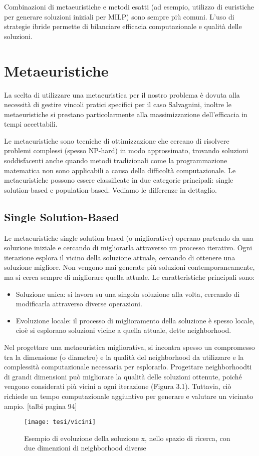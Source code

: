 Combinazioni di metaeuristiche e metodi esatti (ad esempio, utilizzo di euristiche per generare soluzioni iniziali per MILP) sono sempre più comuni. L'uso di strategie ibride permette di bilanciare efficacia computazionale e qualità delle soluzioni. 

\section{Metaeuristiche}

La scelta di utilizzare una metaeuristica per il nostro problema è dovuta alla necessità di gestire vincoli pratici specifici per il caso Salvagnini, inoltre le metaeuristiche si prestano particolarmente alla massimizzazione dell'efficacia in tempi accettabili.

Le metaeuristiche sono tecniche di ottimizzazione che cercano di risolvere problemi complessi (spesso NP-hard) in modo approssimato, trovando soluzioni soddisfacenti anche quando metodi tradizionali come la programmazione matematica non sono applicabili a causa della difficoltà computazionale. Le metaeuristiche possono essere classificate in due categorie principali: single solution-based e population-based. Vediamo le differenze in dettaglio.

\subsection{Single Solution-Based}

Le metaeuristiche single solution-based (o migliorative) operano partendo da una soluzione iniziale e cercando di migliorarla attraverso un processo iterativo. Ogni iterazione esplora il vicino della soluzione attuale, cercando di ottenere una soluzione migliore. Non vengono mai generate più soluzioni contemporaneamente, ma si cerca sempre di migliorare quella attuale. Le caratteristiche principali sono:
\begin{itemize}
    \item Soluzione unica: si lavora su una singola soluzione alla volta, cercando di modificarla attraverso diverse operazioni.
    \item Evoluzione locale: il processo di miglioramento della soluzione è spesso locale, cioè si esplorano soluzioni vicine a quella attuale, dette neighborhood.
\end{itemize}
Nel progettare una metaeuristica migliorativa, si incontra spesso un compromesso tra la dimensione (o diametro) e la qualità del neighborhood da utilizzare e la complessità computazionale necessaria per esplorarlo. Progettare neighborhoodti di grandi dimensioni può migliorare la qualità delle soluzioni ottenute, poiché vengono considerati più vicini a ogni iterazione (Figura 3.1). Tuttavia, ciò richiede un tempo computazionale aggiuntivo per generare e valutare un vicinato ampio. [talbi pagina 94]
\begin{figure}[h!] 
    \centering 
    \texttt{[image: tesi/vicini]} 
    \caption{Esempio di evoluzione della soluzione x, nello spazio di ricerca, con due dimenzioni di neighborhood diverse}
\end{figure}

